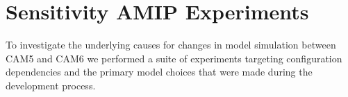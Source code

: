 \section{Sensitivity AMIP Experiments}

To investigate the underlying causes for changes in model simulation between CAM5 and CAM6 we performed a suite of experiments targeting configuration dependencies and the primary model choices that were made during the development process.



